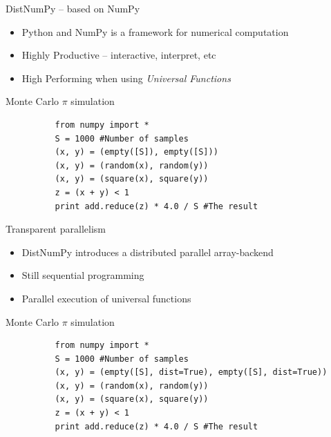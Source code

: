 \documentclass{beamer}
\begin{document}
\begin{frame}[fragile]{DistNumPy -- based on NumPy}
\begin{itemize}
  \item Python and NumPy is a framework for numerical computation
  \item Highly Productive -- interactive, interpret, etc
  \item High Performing when using \emph{Universal Functions}
\end{itemize}
\vspace{15px}
\begin{center}
\begin{small}
Monte Carlo $\pi$ simulation
\end{small}
\begin{scriptsize}
\begin{verbatim}
          from numpy import *
          S = 1000 #Number of samples
          (x, y) = (empty([S]), empty([S]))
          (x, y) = (random(x), random(y))
          (x, y) = (square(x), square(y))
          z = (x + y) < 1
          print add.reduce(z) * 4.0 / S #The result
\end{verbatim}
\end{scriptsize}
\end{center}
\end{frame}


\begin{frame}[fragile]{Transparent parallelism}
\begin{itemize}
  \item DistNumPy introduces a distributed parallel array-backend
  \item Still sequential programming
  \item Parallel execution of universal functions
\end{itemize}
\vspace{15px}
\begin{center}
\begin{small}
Monte Carlo $\pi$ simulation
\end{small}
\begin{scriptsize}
\begin{verbatim}
          from numpy import *
          S = 1000 #Number of samples
          (x, y) = (empty([S], dist=True), empty([S], dist=True))
          (x, y) = (random(x), random(y))
          (x, y) = (square(x), square(y))
          z = (x + y) < 1
          print add.reduce(z) * 4.0 / S #The result
\end{verbatim}
\end{scriptsize}
\end{center}
\end{frame}
\end{document}
